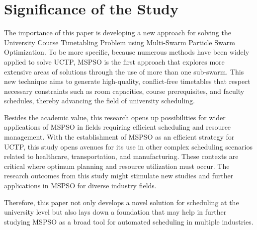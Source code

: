 \section{Significance of the Study}
\label{sec:significance}

The importance of this paper is developing a new approach for solving the University Course Timetabling Problem using Multi-Swarm Particle Swarm Optimization. To be more specific, because numerous methods have been widely applied to solve UCTP, MSPSO is the first approach that explores more extensive areas of solutions through the use of more than one sub-swarm. This new technique aims to generate high-quality, conflict-free timetables that respect necessary constraints such as room capacities, course prerequisites, and faculty schedules, thereby advancing the field of university scheduling.

Besides the academic value, this research opens up possibilities for wider applications of MSPSO in fields requiring efficient scheduling and resource management. With the establishment of MSPSO as an efficient strategy for UCTP, this study opens avenues for its use in other complex scheduling scenarios related to healthcare, transportation, and manufacturing. These contexts are critical where optimum planning and resource utilization must occur. The research outcomes from this study might stimulate new studies and further applications in MSPSO for diverse industry fields.

Therefore, this paper not only develops a novel solution for scheduling at the university level but also lays down a foundation that may help in further studying MSPSO as a broad tool for automated scheduling in multiple industries.
